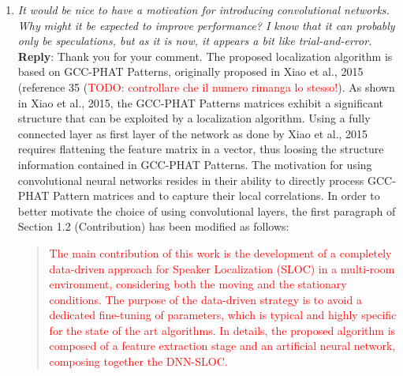 \documentclass[11pt, technote, letterpaper, oneside, onecolumn]{IEEEtran}
\begin{document}
\begin{enumerate}


\item \textit{It would be nice to have a motivation for introducing convolutional networks. Why might it be expected to improve performance? I know that it can probably only be speculations, but as it is now, it appears a bit like trial-and-error.\\}
\textbf{Reply}: Thank you for your comment. The proposed localization algorithm is based on GCC-PHAT Patterns, originally proposed in Xiao et al., 2015 (reference 35 (\textcolor{red}{TODO: controllare che il numero rimanga lo stesso!}). As shown in Xiao et al., 2015, the GCC-PHAT Patterns matrices exhibit a significant structure that can be exploited by a localization algorithm. Using a fully connected layer as first layer of the network as done by Xiao et al., 2015 requires flattening the feature matrix in a vector, thus loosing the structure information contained in GCC-PHAT Patterns. The motivation for using convolutional neural networks resides in their ability to directly process GCC-PHAT Pattern matrices and to capture their local correlations. In order to better motivate the choice of using convolutional layers, the first paragraph of Section 1.2 (Contribution) has been modified as follows:
\begin{quote}
\textcolor{red}{
The main contribution of this work is the development of a completely data-driven approach for Speaker Localization (SLOC) in a multi-room environment, considering both the moving and the stationary conditions. %
The purpose of the data-driven strategy is to avoid a dedicated fine-tuning of parameters, which is typical and highly specific for the state of the art algorithms.
In details, the proposed algorithm is composed of a feature extraction stage and an artificial neural network, composing together the DNN-SLOC. %
}
\end{quote}
\end{enumerate}
\end{document}
